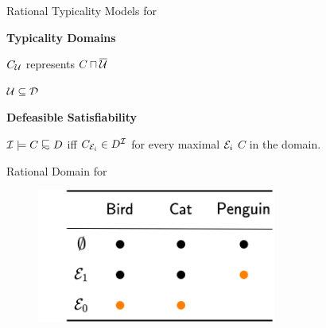 \documentclass[10pt]{beamer}
\begin{document}
\begin{frame}[fragile]{Rational Typicality Models for \ELbot}

  \begin{center}
\Large{
  \textbf{Typicality Domains}} 
  
\large{
  ${C}_{\mathcal{U}}$ represents $C \sqcap \overline{\mathcal{U}}$
  
  $\mathcal{U} \subseteq \mathcal{D}$
  } 

\pause
\vspace{0.5cm}
\Large{
  \textbf{Defeasible Satisfiability}} 
    
  \large{
    $\Imc \models C \definc D$ iff ${C}_{\mathcal{E}_i} \in D^{\mathcal{I}}$ for every maximal $\mathcal{E}_i$ \wrt $C$ in the domain.
    } 
\end{center}
\end{frame}

%
%

\begin{frame}[fragile]{Rational Domain for \ELbot}
  
  \begin{figure}
    \centering
        \includegraphics[width=0.7\textwidth]{img/ratmod001.png}
    \end{figure}

\end{frame}

%
%
\end{document}
